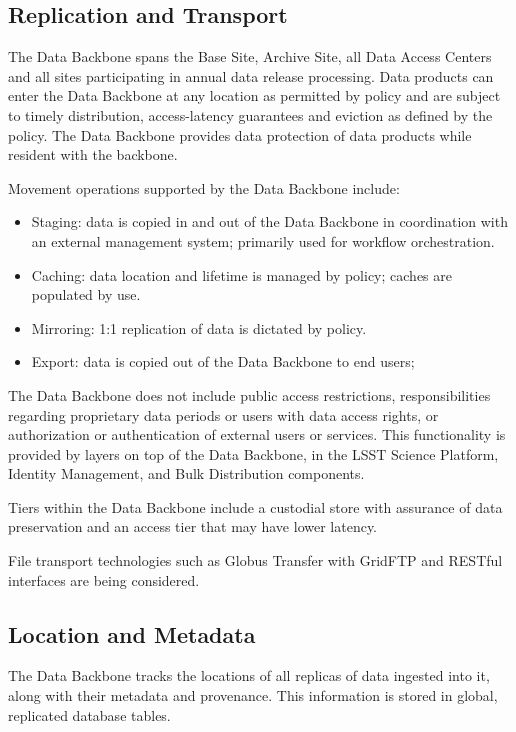 \documentclass[DM,toc]{lsstdoc}
\begin{document}
\subsection{Replication and Transport}\label{dbb-replication-and-transport}

The Data Backbone spans the Base Site, Archive Site, all Data Access Centers
and all sites participating in annual data release processing.  Data products
can enter the Data Backbone at any location as permitted by policy and are
subject to timely distribution, access-latency guarantees and eviction as
defined by the policy. The Data Backbone provides data protection of data
products while resident with the backbone.

Movement operations supported by the Data Backbone include:
\begin{itemize}
	\item Staging: data is copied in and out of the Data Backbone in coordination with an external management system; primarily used for workflow orchestration.
	\item Caching: data location and lifetime is managed by policy; caches are populated by use.
	\item Mirroring: 1:1 replication of data is dictated by policy.
	\item Export: data is copied out of the Data Backbone to end users;
\end{itemize}

The Data Backbone does not include public access restrictions, responsibilities
regarding proprietary data periods or users with data access rights, or
authorization or authentication of external users or services. This
functionality is provided by layers on top of the Data Backbone, in the
LSST Science Platform, Identity Management, and Bulk Distribution components.

Tiers within the Data Backbone include a custodial store with assurance of
data preservation and an access tier that may have lower latency.

File transport technologies such as Globus Transfer \citep{GlobusTransfer} with
GridFTP and RESTful interfaces are being considered.

\subsection{Location and Metadata}\label{dbb-location-and-metadata}

The Data Backbone tracks the locations of all replicas of data ingested into
it, along with their metadata and provenance.  This information is stored in
global, replicated database tables.
\end{document}
